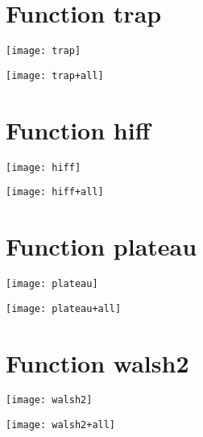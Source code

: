 \section{Function trap}
\begin{center}

\end{center}
\begin{center}

\end{center}
\begin{center}
\texttt{[image: trap]}
\end{center}
\begin{center}
\texttt{[image: trap+all]}
\end{center}
\newpage
\section{Function hiff}
\begin{center}

\end{center}
\begin{center}

\end{center}
\begin{center}
\texttt{[image: hiff]}
\end{center}
\begin{center}
\texttt{[image: hiff+all]}
\end{center}
\newpage
\section{Function plateau}
\begin{center}

\end{center}
\begin{center}

\end{center}
\begin{center}
\texttt{[image: plateau]}
\end{center}
\begin{center}
\texttt{[image: plateau+all]}
\end{center}
\newpage
\section{Function walsh2}
\begin{center}

\end{center}
\begin{center}

\end{center}
\begin{center}
\texttt{[image: walsh2]}
\end{center}
\begin{center}
\texttt{[image: walsh2+all]}
\end{center}
